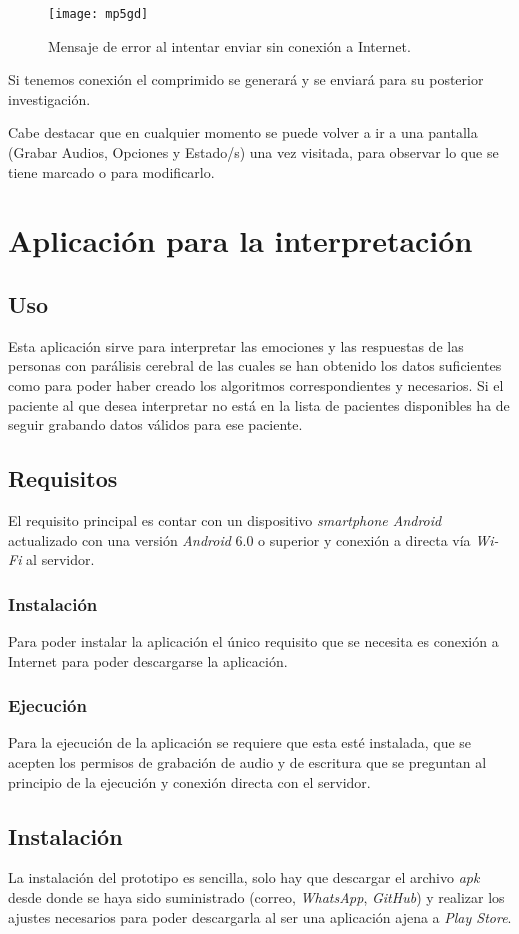 \begin{figure}[H]
	\centering
	\texttt{[image: mp5gd]}
	\caption{Mensaje de error al intentar enviar sin conexión a Internet.}
	\label{fig:mp5gd}
\end{figure}

Si tenemos conexión el comprimido se generará y se enviará para su posterior investigación.

Cabe destacar que en cualquier momento se puede volver a ir a una pantalla (Grabar Audios, Opciones y Estado/s) una vez visitada, para observar lo que se tiene marcado o para modificarlo.
\newpage
\section{Aplicación para la interpretación}
\subsection{Uso}
Esta aplicación sirve para interpretar las emociones y las respuestas de las personas con parálisis cerebral de las cuales se han obtenido los datos suficientes como para poder haber creado los algoritmos correspondientes y necesarios. Si el paciente al que desea interpretar no está en la lista de pacientes disponibles ha de seguir grabando datos válidos para ese paciente.
\subsection{Requisitos}
El requisito principal es contar con un dispositivo \textit{smartphone Android} actualizado con una versión \textit{Android} 6.0 o superior y conexión a directa vía \textit{Wi-Fi} al servidor.
\subsubsection{Instalación}
Para poder instalar la aplicación el único requisito que se necesita es conexión a Internet para poder descargarse la aplicación.
\subsubsection{Ejecución}
Para la ejecución de la aplicación se requiere que esta esté instalada, que se acepten los permisos de grabación de audio y de escritura que se preguntan al principio de la ejecución y conexión directa con el servidor.
\subsection{Instalación}
La instalación del prototipo es sencilla, solo hay que descargar el archivo \textit{apk} desde donde se haya sido suministrado (correo, \textit{WhatsApp}, \textit{GitHub}) y realizar los ajustes necesarios para poder descargarla al ser una aplicación ajena a \textit{Play Store}.

